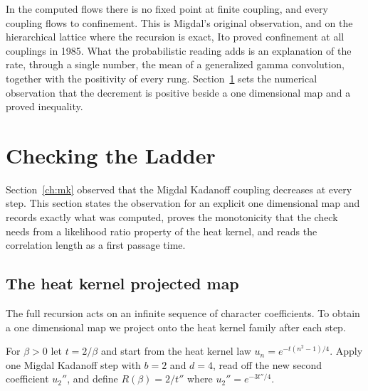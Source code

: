 In the computed flows there is no fixed point at finite coupling, and every coupling flows to confinement. This is Migdal's original observation, and on the hierarchical lattice where the recursion is exact, Ito\cite{Ito85} proved confinement at all couplings in 1985. What the probabilistic reading adds is an explanation of the rate, through a single number, the mean of a generalized gamma convolution\cite{Bo92}, together with the positivity of every rung. Section~\ref{ch:verification} sets the numerical observation that the decrement is positive beside a one dimensional map and a proved inequality.

\section{Checking the Ladder}\label{ch:verification}

Section~\ref{ch:mk} observed that the Migdal Kadanoff coupling decreases at every step. This section states the observation for an explicit one dimensional map and records exactly what was computed, proves the monotonicity that the check needs from a likelihood ratio property of the heat kernel, and reads the correlation length as a first passage time.

\subsection{The heat kernel projected map}

The full recursion acts on an infinite sequence of character coefficients. To obtain a one dimensional map we project onto the heat kernel family after each step.

\begin{definition}
For $\beta>0$ let $t=2/\beta$ and start from the heat kernel law $u_n=e^{-t(n^2-1)/4}$. Apply one Migdal Kadanoff step with $b=2$ and $d=4$, read off the new second coefficient $u_2''$, and define $R(\beta)=2/t''$ where $u_2''=e^{-3t''/4}$.
\end{definition}

